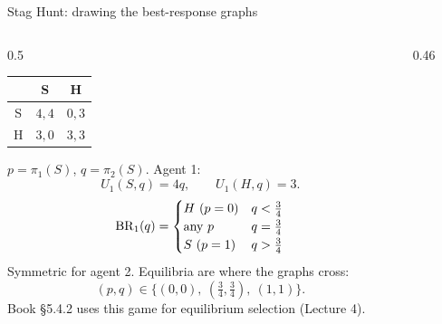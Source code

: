 \documentclass[aspectratio=169,11pt]{beamer}
\begin{document}
\begin{frame}{Stag Hunt: drawing the best-response graphs}
  \begin{columns}[T]
    \begin{column}{0.5\textwidth}
      \centering
      \footnotesize
      \begin{tabular}{c|cc}
          & S & H \\ \hline
        S & $4,4$ & $0,3$ \\
        H & $3,0$ & $3,3$
      \end{tabular}
      \raggedright
      \medskip

      \small
      $p = \pi_1(S)$, $q = \pi_2(S)$. Agent 1:
      \[
        U_1(S, q) = 4q, \qquad U_1(H, q) = 3 .
      \]
      \[
        \operatorname{BR}_1(q) =
        \begin{cases}
          H\ (p = 0) & q < \tfrac34 \\
          \text{any } p & q = \tfrac34 \\
          S\ (p = 1) & q > \tfrac34
        \end{cases}
      \]
      Symmetric for agent 2. Equilibria are where the graphs cross:
      \[
        (p, q) \in \{(0,0),\ (\tfrac34, \tfrac34),\ (1,1)\}.
      \]
      Book \S5.4.2 uses this game for equilibrium selection (Lecture 4).
    \end{column}
    \begin{column}{0.46\textwidth}
      \centering
      
    \end{column}
  \end{columns}
\end{frame}
\end{document}
